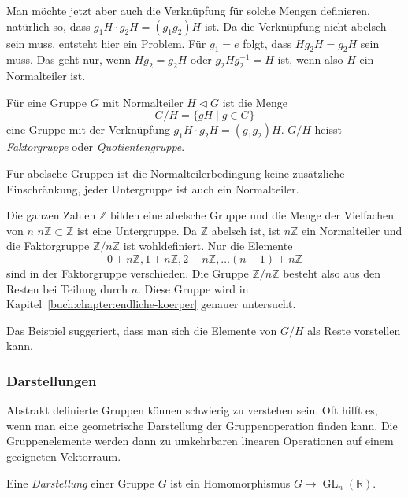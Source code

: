 Man möchte jetzt aber auch die Verknüpfung für solche Mengen 
definieren, natürlich so, dass $g_1H\cdot g_2H = (g_1g_2)H$ ist.
Da die Verknüpfung nicht abelsch sein muss, entsteht hier
ein Problem.
Für $g_1=e$ folgt, dass $Hg_2H=g_2H$ sein muss.
Das geht nur, wenn $Hg_2=g_2H$ oder $g_2Hg_2^{-1}=H$ ist, wenn
also $H$ ein Normalteiler ist.

\begin{definition}
Für eine Gruppe $G$ mit Normalteiler  $H\triangleleft G$ ist die
Menge
\[
G/H = \{ gH \;|\; g\in G\}
\]
eine Gruppe mit der Verknüpfung $g_1H\cdot g_2H=(g_1g_2)H$.
$G/H$ heisst {\em Faktorgruppe} oder {\em Quotientengruppe}.
%
%
\end{definition}

Für abelsche Gruppen ist die Normalteilerbedingung keine zusätzliche
Einschränkung, jeder Untergruppe ist auch ein Normalteiler.

\begin{beispiel}
Die ganzen Zahlen $\mathbb{Z}$ bilden eine abelsche Gruppe und
die Menge der Vielfachen von $n$
$n\mathbb{Z}\subset\mathbb{Z}$ ist eine Untergruppe.
Da $\mathbb{Z}$ abelsch ist, ist $n\mathbb{Z}$ ein Normalteiler
und die Faktorgruppe $\mathbb{Z}/n\mathbb{Z}$ ist wohldefiniert.
Nur die Elemente
\[
0+n\mathbb{Z},
1+n\mathbb{Z},
2+n\mathbb{Z},
\dots
(n-1)+n\mathbb{Z}
\]
sind in der Faktorgruppe verschieden.
Die Gruppe $\mathbb{Z}/n\mathbb{Z}$ besteht also aus den Resten
bei Teilung durch $n$.
Diese Gruppe wird in Kapitel~\ref{buch:chapter:endliche-koerper}
genauer untersucht.
\end{beispiel}

Das Beispiel suggeriert, dass man sich die Elemente von $G/H$
als Reste vorstellen kann.

\subsubsection{Darstellungen}
Abstrakt definierte Gruppen können schwierig zu verstehen sein.
Oft hilft es, wenn man eine geometrische Darstellung der Gruppenoperation
finden kann.
Die Gruppenelemente werden dann zu umkehrbaren linearen Operationen
auf einem geeigneten Vektorraum.

\begin{definition}
\label{buch:vektorenmatrizen:def:darstellung}
Eine {\em Darstellung} einer Gruppe $G$ ist ein Homomorphismus 
$G\to\operatorname{GL}_n(\mathbb{R})$.
\end{definition}

